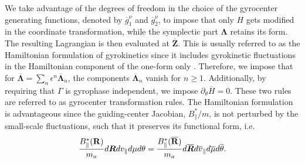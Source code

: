 We take advantage of the degrees of freedom in the choice of the gyrocenter generating functions, denoted by $\overline{g}^\nu_{1}$ and $\overline{g}_2^\nu$, to impose that only $H$ gets modified in the coordinate transformation, while the symplectic part $\mathbf \Lambda$ retains its form.
%
The resulting Lagrangian is then evaluated at $\overline{\mathbf Z}$.
%
This is usually referred to as the Hamiltonian formulation of gyrokinetics since it includes gyrokinetic fluctuations in the Hamiltonian component of the one-form only \citep{Brizard2007a,Miyato2011}.
%
Therefore, we impose that for $\overline{\mathbf \Lambda}=\sum_n \epsilon^n \overline{\mathbf \Lambda}_n$, the components $\overline{\mathbf \Lambda}_n$ vanish for $n\geq1$.
%
Additionally, by requiring that $\Gamma$ is gyrophase independent, we impose $\partial_\theta \overline{H} =0$.
%
These two rules are referred to as gyrocenter transformation rules.
%
The Hamiltonian formulation is advantageous since the guiding-center Jacobian, $ B_{\parallel}^* / m$, is not perturbed by the small-scale fluctuations, such that it preserves its functional form, i.e. 
%
\begin{equation}
\frac{B_{\parallel}^*(\mathbf R)}{m_a}  d \bm{R} d v_{\parallel} d \mu d \theta  =\frac{B_{\parallel}^*(\overline{\mathbf R})}{m_a}  d \overline{\bm{R}} d \overline{v}_{\parallel} d \overline{\mu} d \overline{\theta}.
\end{equation}

